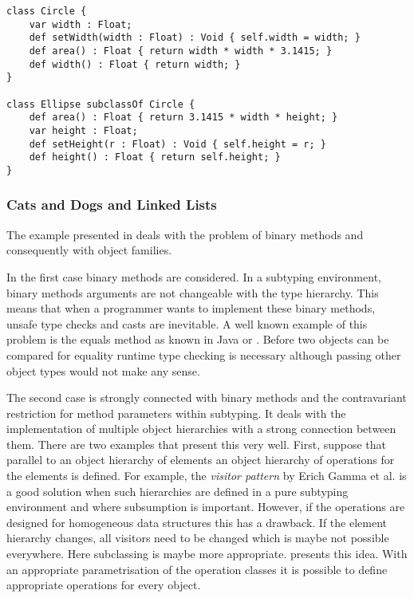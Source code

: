 \begin{lstlisting}[float=ht,language=ooplss,caption=Circle-Ellipse problem in \ooplss,label=lst:ellipseCircleOoplss]
class Circle {
	var width : Float;
	def setWidth(width : Float) : Void { self.width = width; }
	def area() : Float { return width * width * 3.1415; }
	def width() : Float { return width; }
}

class Ellipse subclassOf Circle {
	def area() : Float { return 3.1415 * width * height; }
	var height : Float;
	def setHeight(r : Float) : Void { self.height = r; }
	def height() : Float { return self.height; }
}
\end{lstlisting}

\subsubsection{Cats and Dogs and Linked Lists}
The example presented in  deals with the
problem of binary methods and consequently with object families.

In the first case binary methods are considered. In a subtyping
environment, binary methods arguments are not changeable with the type
hierarchy. This means that when a programmer wants to implement these
binary methods, unsafe type checks and casts are inevitable. A well
known example of this problem is the equals method as known in Java or
\cs. Before two objects can be compared for equality runtime type checking
is necessary although passing other object types would not make any sense.

The second case is strongly connected with binary methods and the
contravariant restriction for method parameters within subtyping. It
deals with the implementation of multiple object hierarchies with a
strong connection between them. There are two examples that present
this very well. First, suppose that parallel to an object hierarchy
of elements an object hierarchy of operations for the elements is
defined. For example, the \emph{visitor pattern} by Erich Gamma et
al. \cite{gamma_design_1995} is a good solution when such hierarchies
are defined in a pure subtyping environment and where subsumption is
important. However, if the operations are designed for homogeneous data
structures this has a drawback. If the element hierarchy changes, all
visitors need to be changed which is maybe not possible everywhere. Here
subclassing is maybe more appropriate.  presents
this idea. With an appropriate parametrisation of the operation classes
it is possible to define appropriate operations for every object.

